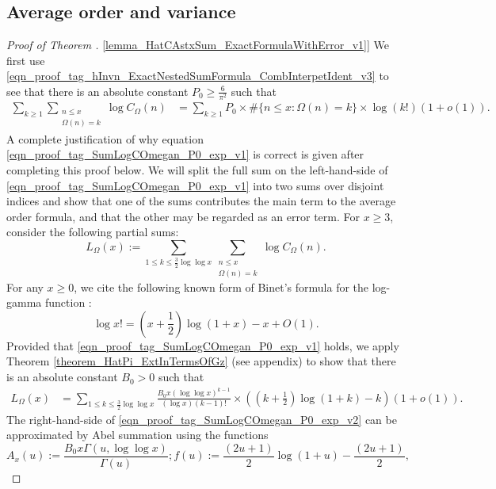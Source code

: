 \documentclass[11pt,reqno,a4letter]{article}
\newcommand{\hlocalref}[1]{\hyperref[#1]{\ref{#1}}}
\numberwithin{equation}{section}
\numberwithin{figure}{section}
\numberwithin{table}{section}
\theoremstyle{plain}
\numberwithin{theorem}{section}
\theoremstyle{definition}
\begin{document}
\subsection{Average order and variance}
\label{subSection_AvgOrdersOfTheUnsignedSequences} 

\begin{proof}[Proof of Theorem \hlocalref{lemma_HatCAstxSum_ExactFormulaWithError_v1}]  
We first use \eqref{eqn_proof_tag_hInvn_ExactNestedSumFormula_CombInterpetIdent_v3} to 
see that there is an absolute constant $P_0 \geq \frac{6}{\pi^2}$ such that 
\begin{align}
\label{eqn_proof_tag_SumLogCOmegan_P0_exp_v1}
\sum_{k \geq 1} \sum_{\substack{n \leq x \\ \Omega(n)=k}} \log C_{\Omega}(n) & = 
	\sum_{k \geq 1} P_0 \times \#\{n \leq x: \Omega(n)=k\} \times \log(k!) (1 + o(1)). 
\end{align}
A complete justification of why equation 
\eqref{eqn_proof_tag_SumLogCOmegan_P0_exp_v1} 
is correct is given after completing this proof below.
We will split the full sum on the left-hand-side of 
\eqref{eqn_proof_tag_SumLogCOmegan_P0_exp_v1} into two sums over disjoint indices 
and show that one of the sums contributes the main term to the average order formula, 
and that the other may be regarded as an error term. 
For $x \geq 3$, consider the following partial sums:
\[
L_{\Omega}(x) := \sum_{1 \leq k \leq \frac{3}{2}\log\log x} 
	\sum_{\substack{n \leq x \\ \Omega(n)=k}} \log C_{\Omega}(n). 
\]
For any $x \geq 0$, we cite the following known form of 
Binet's formula for the log-gamma function \cite[\S 5.9(i)]{NISTHB}: 
\[
\log x! = \left(x+\frac{1}{2}\right)\log(1+x) - x + O(1). 
\]
Provided that \eqref{eqn_proof_tag_SumLogCOmegan_P0_exp_v1} holds, 
we apply Theorem \ref{theorem_HatPi_ExtInTermsOfGz} 
(see appendix) to show that there is an absolute constant $B_0 > 0$ such that 
\begin{align}
\label{eqn_proof_tag_SumLogCOmegan_P0_exp_v2}
L_{\Omega}(x) & = \sum_{1 \leq k \leq \frac{3}{2}\log\log x} 
	\frac{B_0 x (\log\log x)^{k-1}}{(\log x) (k-1)!} \times \left(
	\left(k+\frac{1}{2}\right) \log(1+k) - k\right)\left(1 + o(1)\right). 
\end{align}
The right-hand-side of \eqref{eqn_proof_tag_SumLogCOmegan_P0_exp_v2} can be 
approximated by Abel summation using the functions 
\[
A_x(u) := \frac{B_0 x \Gamma\left(u, \log\log x\right)}{\Gamma\left(u\right)}; 
     f(u) := \frac{(2u+1)}{2} \log\left(1 + u\right) - \frac{(2u+1)}{2}, 
\]
\end{proof}
\end{document}
